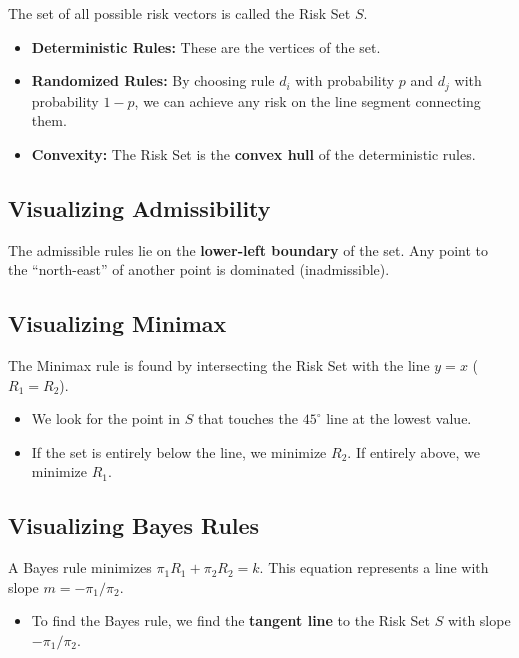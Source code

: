 \documentclass[
  letterpaper,
  DIV=11,
  numbers=noendperiod]{scrreprt}
\providecommand{\tightlist}{%
  \setlength{\itemsep}{0pt}\setlength{\parskip}{0pt}}
\renewcommand{\[}{\begin{equation}}
\renewcommand{\]}{\end{equation}}
\theoremstyle{definition}
\theoremstyle{plain}
\theoremstyle{plain}
\theoremstyle{plain}
\theoremstyle{definition}
\theoremstyle{plain}
\theoremstyle{remark}
\begin{document}
The set of all possible risk vectors is called the Risk Set \(S\).

\begin{itemize}
\tightlist
\item
  \textbf{Deterministic Rules:} These are the vertices of the set.
\item
  \textbf{Randomized Rules:} By choosing rule \(d_i\) with probability
  \(p\) and \(d_j\) with probability \(1-p\), we can achieve any risk on
  the line segment connecting them.
\item
  \textbf{Convexity:} The Risk Set is the \textbf{convex hull} of the
  deterministic rules.
\end{itemize}

\subsection{Visualizing Admissibility}\label{visualizing-admissibility}

The admissible rules lie on the \textbf{lower-left boundary} of the set.
Any point to the ``north-east'' of another point is dominated
(inadmissible).

\subsection{Visualizing Minimax}\label{visualizing-minimax}

The Minimax rule is found by intersecting the Risk Set with the line
\(y=x\) (\(R_1 = R_2\)).

\begin{itemize}
\tightlist
\item
  We look for the point in \(S\) that touches the \(45^\circ\) line at
  the lowest value.
\item
  If the set is entirely below the line, we minimize \(R_2\). If
  entirely above, we minimize \(R_1\).
\end{itemize}

\subsection{Visualizing Bayes Rules}\label{visualizing-bayes-rules}

A Bayes rule minimizes \(\pi_1 R_1 + \pi_2 R_2 = k\). This equation
represents a line with slope \(m = -\pi_1 / \pi_2\).

\begin{itemize}
\tightlist
\item
  To find the Bayes rule, we find the \textbf{tangent line} to the Risk
  Set \(S\) with slope \(-\pi_1 / \pi_2\).
\end{itemize}
\end{document}
